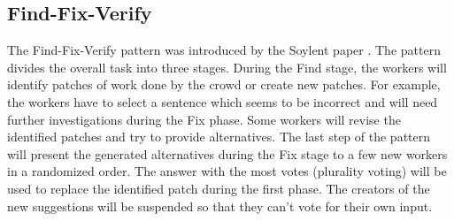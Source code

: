 \subsection{Find-Fix-Verify}
The Find-Fix-Verify pattern was introduced by the Soylent paper \cite{soylent}. The pattern divides the overall task into three stages. During the Find stage, the workers will identify patches of work done by the crowd or create new patches. For example, the workers have to select a sentence which seems to be incorrect and will need further investigations during the Fix phase. Some workers will revise the identified patches and try to provide alternatives. The last step of the pattern will present the generated alternatives during the Fix stage to a few new workers in a randomized order. The answer with the most votes (plurality voting) will be used to replace the identified patch during the first phase. The creators of the new suggestions will be suspended so that they can't vote for their own input.

